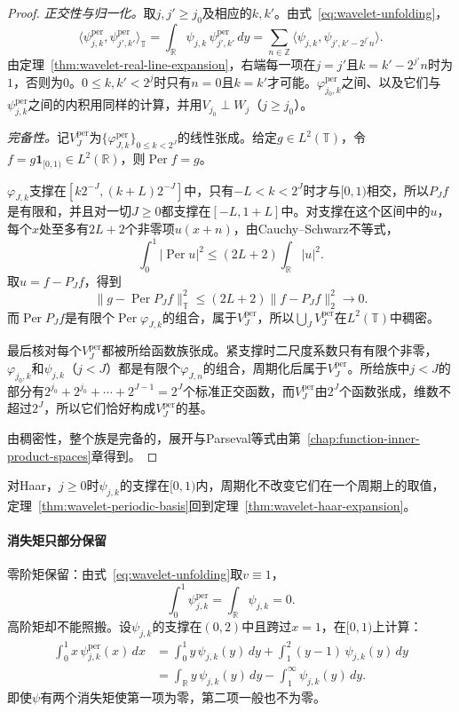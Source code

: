 \begin{proof}
\emph{正交性与归一化。}取$j,j'\geq j_0$及相应的$k,k'$。由式~\eqref{eq:wavelet-unfolding}，
\[
 \langle\psi^{\mathrm{per}}_{j,k},\psi^{\mathrm{per}}_{j',k'}\rangle_{\mathbb T}
 =\int_{\mathbb R}\psi_{j,k}\,\psi^{\mathrm{per}}_{j',k'}\,dy
 =\sum_{n\in\mathbb Z}\langle\psi_{j,k},\psi_{j',k'-2^{j'}n}\rangle.
\]
由定理~\ref{thm:wavelet-real-line-expansion}，右端每一项在$j=j'$且$k=k'-2^{j'}n$时为$1$，否则为$0$。$0\leq k,k'<2^j$时只有$n=0$且$k=k'$才可能。$\varphi^{\mathrm{per}}_{j_0,k}$之间、以及它们与$\psi^{\mathrm{per}}_{j,k}$之间的内积用同样的计算，并用$V_{j_0}\perp W_j$（$j\geq j_0$）。

\emph{完备性。}记$V^{\mathrm{per}}_J$为$\{\varphi^{\mathrm{per}}_{J,k}\}_{0\leq k<2^J}$的线性张成。给定$g\in L^2(\mathbb T)$，令$f=g\mathbf{1}_{[0,1)}\in L^2(\mathbb R)$，则$\operatorname{Per}f=g$。

$\varphi_{J,k}$支撑在$[k2^{-J},(k+L)2^{-J}]$中，只有$-L<k<2^J$时才与$[0,1)$相交，所以$P_Jf$是有限和，并且对一切$J\geq0$都支撑在$[-L,1+L]$中。对支撑在这个区间中的$u$，每个$x$处至多有$2L+2$个非零项$u(x+n)$，由Cauchy--Schwarz不等式，
\[
 \int_0^1\lvert\operatorname{Per}u\rvert^2\leq(2L+2)\int_{\mathbb R}\lvert u\rvert^2.
\]
取$u=f-P_Jf$，得到
\[
 \lVert g-\operatorname{Per}P_Jf\rVert_{\mathbb T}^2\leq(2L+2)\lVert f-P_Jf\rVert_2^2\to0.
\]
而$\operatorname{Per}P_Jf$是有限个$\operatorname{Per}\varphi_{J,k}$的组合，属于$V^{\mathrm{per}}_J$，所以$\bigcup_JV^{\mathrm{per}}_J$在$L^2(\mathbb T)$中稠密。

最后核对每个$V^{\mathrm{per}}_J$都被所给函数族张成。紧支撑时二尺度系数只有有限个非零，$\varphi_{j_0,k}$和$\psi_{j,k}$（$j<J$）都是有限个$\varphi_{J,n}$的组合，周期化后属于$V^{\mathrm{per}}_J$。所给族中$j<J$的部分有$2^{j_0}+2^{j_0}+\cdots+2^{J-1}=2^J$个标准正交函数，而$V^{\mathrm{per}}_J$由$2^J$个函数张成，维数不超过$2^J$，所以它们恰好构成$V^{\mathrm{per}}_J$的基。

由稠密性，整个族是完备的，展开与Parseval等式由第~\ref{chap:function-inner-product-spaces}章得到。
\end{proof}

对Haar，$j\geq0$时$\psi_{j,k}$的支撑在$[0,1)$内，周期化不改变它们在一个周期上的取值，定理~\ref{thm:wavelet-periodic-basis}回到定理~\ref{thm:wavelet-haar-expansion}。

\paragraph{消失矩只部分保留}
零阶矩保留：由式~\eqref{eq:wavelet-unfolding}取$v\equiv1$，
\[
 \int_0^1\psi^{\mathrm{per}}_{j,k}=\int_{\mathbb R}\psi_{j,k}=0.
\]
高阶矩却不能照搬。设$\psi_{j,k}$的支撑在$(0,2)$中且跨过$x=1$，在$[0,1)$上计算：
\begin{equation*}
\begin{aligned}
 \int_0^1x\,\psi^{\mathrm{per}}_{j,k}(x)\,dx
 &=\int_0^1y\,\psi_{j,k}(y)\,dy+\int_1^2(y-1)\,\psi_{j,k}(y)\,dy\\
 &=\int_{\mathbb R}y\,\psi_{j,k}(y)\,dy-\int_1^{\infty}\psi_{j,k}(y)\,dy.
\end{aligned}
\end{equation*}
即使$\psi$有两个消失矩使第一项为零，第二项一般也不为零。

